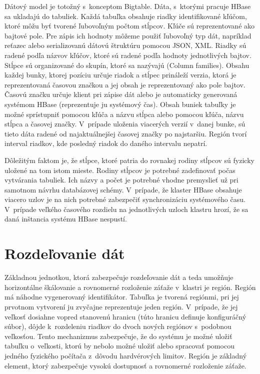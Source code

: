 \documentclass[11pt,twoside,a4paper]{book}
\begin{document}
Dátový model je totožný s~konceptom Bigtable. Dáta, s~ktorými pracuje HBase sa ukladajú do tabuliek. Každá tabuľka obsahuje riadky identifikované kľúčom, ktoré môžu byť tvorené ľubovoľným počtom stĺpcov. Kľúče sú reprezentované ako bajtové pole. Pre zápis ich hodnoty môžeme použiť ľubovoľný typ dát, napríklad reťazec alebo serializovanú dátovú štruktúru pomocou JSON, XML. Riadky sú radené podľa názvov kľúčov, ktoré sú radené podľa hodnoty jednotlivých bajtov. Stĺpce sú organizované do skupín, ktoré sa nazývajú  (Column families). Obsahu každej bunky, ktorej pozíciu určuje riadok a stĺpec prináleží verzia, ktorá je reprezentovaná časovou značkou a jej obsah je reprezentovaný ako pole bajtov. Časovú značku určuje klient pri zápise dát alebo je automaticky generovaná systémom HBase (reprezentuje ju systémový čas). Obsah buniek tabuľky je možné sprístupniť pomocou kľúča a názvu stĺpca alebo pomocou kľúča, názvu stĺpca a časovej značky. V~prípade uloženia viacerých verzií v~danej bunke, sú tieto dáta radené od najaktuálnejšej časovej značky po najstaršiu. Región tvorí interval riadkov, kde posledný riadok do daného intervalu nepatrí.

Dôležitým faktom je, že stĺpce, ktoré patria do rovnakej rodiny stĺpcov sú fyzicky uložené na tom istom mieste. Rodiny stĺpcov je potrebné zadefinovať počas vytvárania tabuliek. Ich názvy a počet je potrebné vhodne premyslieť už pri samotnom návrhu databázovej schémy. V~prípade, že klaster HBase obsahuje viacero uzlov je na nich potrebné zabezpečiť synchronizáciu systémového času. V~prípade veľkého časového rozdielu na jednotlivých uzloch klastru hrozí, že sa daná inštancia systému HBase nespustí.

\section{Rozdeľovanie dát}

Základnou jednotkou, ktorá zabezpečuje rozdeľovanie dát a teda umožňuje horizontálne škálovanie a rovnomerné rozloženie záťaže v~klastri je región. Región má náhodne vygenerovaný identifikátor. Tabuľka je tvorená regiónmi, pri jej prvotnom vytvorení ju zvyčajne reprezentuje jeden región. V~prípade, že jej veľkosť dosiahne vopred stanovenú hranicu (túto hranicu definuje konfiguráčný súbor), dôjde k~rozdeleniu riadkov do dvoch nových regiónov s~podobnou veľkosťou. Tento mechanizmus zabezpečuje, že do systému je možné uložiť tabuľku o~veľkosti, ktorú by nebolo možné uložiť alebo spracovať pomocou jedného fyzického počítača z~dôvodu hardvérových limitov. Región je základný element, ktorý zabezpečuje vysokú dostupnosť a rovnomerné rozloženie záťaže.
\end{document}
